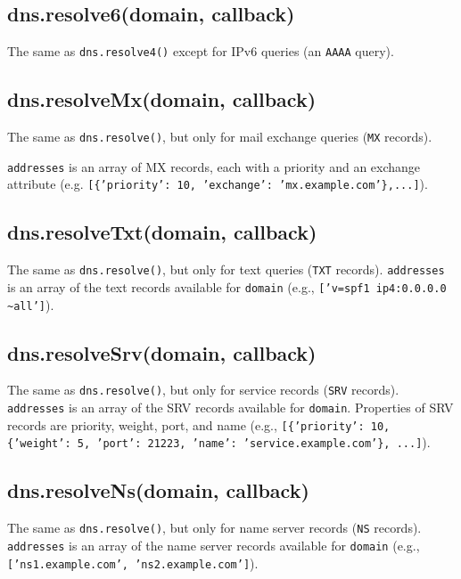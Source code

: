 \subsection{dns.resolve6(domain, callback)}

The same as \texttt{dns.resolve4()} except for IPv6 queries (an
\texttt{AAAA} query).

\subsection{dns.resolveMx(domain, callback)}

The same as \texttt{dns.resolve()}, but only for mail exchange queries
(\texttt{MX} records).

\texttt{addresses} is an array of MX records, each with a priority and
an exchange attribute (e.g.
\texttt{{[}\{'priority': 10, 'exchange': 'mx.example.com'\},...{]}}).

\subsection{dns.resolveTxt(domain, callback)}

The same as \texttt{dns.resolve()}, but only for text queries
(\texttt{TXT} records). \texttt{addresses} is an array of the text
records available for \texttt{domain} (e.g.,
\texttt{{[}'v=spf1 ip4:0.0.0.0 \textasciitilde{}all'{]}}).

\subsection{dns.resolveSrv(domain, callback)}

The same as \texttt{dns.resolve()}, but only for service records
(\texttt{SRV} records). \texttt{addresses} is an array of the SRV
records available for \texttt{domain}. Properties of SRV records are
priority, weight, port, and name (e.g.,
\texttt{{[}\{'priority': 10, \{'weight': 5, 'port': 21223, 'name': 'service.example.com'\}, ...{]}}).

\subsection{dns.resolveNs(domain, callback)}

The same as \texttt{dns.resolve()}, but only for name server records
(\texttt{NS} records). \texttt{addresses} is an array of the name server
records available for \texttt{domain} (e.g.,
\texttt{{[}'ns1.example.com', 'ns2.example.com'{]}}).

